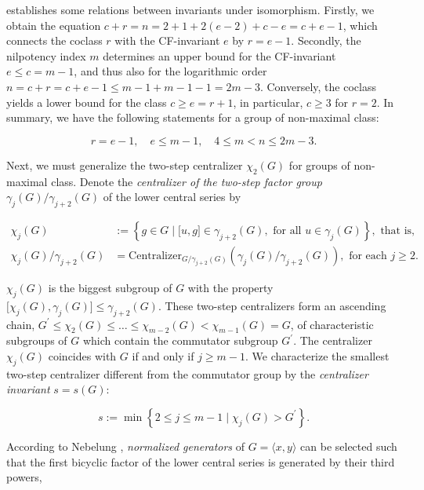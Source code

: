 \documentclass{amsart}
\theoremstyle{definition}
\numberwithin{equation}{section}
\begin{document}
\noindent
establishes some relations between invariants under isomorphism.
Firstly, we obtain the equation \(c+r=n=2+1+2(e-2)+c-e=c+e-1\),
which connects the coclass \(r\) with the CF-invariant \(e\) by \(r=e-1\).
Secondly, the nilpotency index \(m\) determines an upper bound for the CF-invariant \(e\le c=m-1\),
and thus also for the logarithmic order \(n=c+r=c+e-1\le m-1+m-1-1=2m-3\).
Conversely, the coclass yields a lower bound for the class \(c\ge e=r+1\),
in particular, \(c\ge 3\) for \(r=2\).
In summary, we have the following statements for a group of non-maximal class:

\begin{equation}
\label{eqn:ConnectingInvariants}
r=e-1, \quad e \le m-1, \quad 4\le m<n\le 2m-3.
\end{equation}


Next, we must generalize the two-step centralizer \(\chi_2(G)\) for groups of non-maximal class.
Denote the \textit{centralizer of the two-step factor group} \(\gamma_j(G)/\gamma_{j+2}(G)\)
of the lower central series by

\begin{equation}
\label{eqn:TwoStepCentralizerLow}
\begin{aligned}
\chi_j(G)                 &:= \left\lbrace g\in G\mid\lbrack u,g\rbrack\in\gamma_{j+2}(G), \text{ for all } u\in\gamma_j(G)\right\rbrace, \text{ that is,}\\
\chi_j(G)/\gamma_{j+2}(G) &= \mathrm{Centralizer}_{G/\gamma_{j+2}(G)}(\gamma_j(G)/\gamma_{j+2}(G)), \text{ for each } j\ge 2.
\end{aligned}
\end{equation}

\noindent
\(\chi_j(G)\) is the biggest subgroup of \(G\) with the property
\(\lbrack\chi_j(G),\gamma_j(G)\rbrack\le\gamma_{j+2}(G)\).
These two-step centralizers form an ascending chain,
\(G^\prime\le\chi_2(G)\le\ldots\le\chi_{m-2}(G)<\chi_{m-1}(G)=G\),
of characteristic subgroups of \(G\)
which contain the commutator subgroup \(G^\prime\).
The centralizer \(\chi_j(G)\) coincides with \(G\) if and only if \(j\ge m-1\).
We characterize the smallest two-step centralizer
different from the commutator group
by the \textit{centralizer invariant} \(s=s(G)\):

\begin{equation}
\label{eqn:CentralizerInvariant}
s:=\min\left\lbrace 2\le j\le m-1\mid\chi_j(G)>G^\prime\right\rbrace.
\end{equation}


\noindent
According to Nebelung
\cite[p. 57]{Ne1},
\textit{normalized generators} of \(G=\langle x,y\rangle\) can be selected such that
the first bicyclic factor of the lower central series is generated by their third powers,
\end{document}
